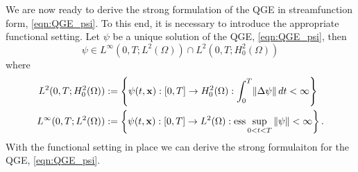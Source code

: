 We are now ready to derive the strong formulation of the QGE in streamfunction
form, \eqref{eqn:QGE_psi}. To this end, it is necessary to introduce the
appropriate functional setting.  Let $\psi$ be a unique solution \cite{Layton08}
of the QGE, \eqref{eqn:QGE_psi}, then
\begin{equation}
  \psi \in L^{\infty}(0, T; L^2(\Omega)) \cap L^2(0, T;H^2_0(\Omega))
  \label{eqn:StrongSpace}
\end{equation}
where
\begin{align*}
  L^2(0, T;H^2_0(\Omega)) &:= \left\{ \psi(t,\mathbf{x}):[0, T] \to H^2_0(\Omega):
    \int_{0}^{T}\! \|\Delta \psi\| \, dt < \infty \right\} \\
  L^{\infty}(0, T;L^2(\Omega)) &:= \left\{ \psi(t,\mathbf{x}):[0, T] \to L^2(\Omega):
    \operatorname{ess} \sup_{0<t<T} \|\psi\| < \infty\right\}.
\end{align*}
With the functional setting in place we can derive the strong formulaiton for
the QGE, \eqref{eqn:QGE_psi}.

